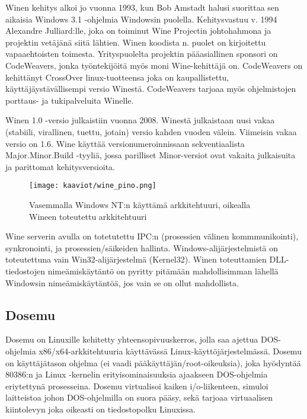 Winen kehitys alkoi jo vuonna 1993, kun Bob Amstadt halusi suorittaa sen aikaisia Windows 3.1 -ohjelmia Windowsin puolella. Kehitysvastuu v. 1994 Alexandre Julliard:lle, joka on toiminut Wine Projectin johtohahmona ja projektin vetäjänä siitä lähtien. Winen koodista n. puolet on kirjoitettu vapaaehtoisten toimesta. Yrityspuolelta projektin pääasiallinen sponsori on CodeWeavers, jonka työntekijöitä myös moni Wine-kehittäjä on. CodeWeavers on kehittänyt CrossOver linux-tuotteensa joka on kaupallistettu, käyttäjäystävällisempi versio Winestä. CodeWeavers tarjoaa myös ohjelmistojen porttaus- ja tukipalveluita Winelle.

Winen 1.0 -versio julkaistiin vuonna 2008. Winestä julkaistaan uusi vakaa (stabiili, virallinen, tuettu, jotain) versio kahden vuoden välein. Viimeisin vakaa versio on 1.6. Wine käyttää versionumeroinnissaan sekventiaalista Major.Minor.Build -tyyliä, jossa parilliset Minor-versiot ovat vakaita julkaisuita ja parittomat kehitysversioita.


\begin{figure}[H]
\centering
\texttt{[image: kaaviot/wine\_pino.png]}
\caption{Vasemmalla Windows NT:n käyttämä arkkitehtuuri, oikealla Wineen toteutettu arkkitehtuuri}
\end{figure}

Wine serverin avulla on totetutettu IPC:n (prosessien välinen kommmunikointi), synkronointi, ja prosessien/säikeiden hallinta. Windows-alijärjestelmistä on toteutettuna vain Win32-alijärjestelmä (Kernel32). Winen toteuttamien DLL-tiedostojen nimeämiskäytäntö on pyritty pitämään mahdollisimman lähellä Windowsin nimeämiskäytäntöä, jos vain se on ollut mahdollista. \cite{wine:architecture}

\subsection{Dosemu}

Dosemu on Linuxille kehitetty yhteensopivuuskerros, jolla saa ajettua DOS-ohjelmia x86/x64-arkkitehtuuria käyttävässä Linux-käyttöjärjestelmässä. Dosemu on käyttäjätason ohjelma (ei vaadi pääkäyttäjän/root-oikeuksia), joka hyödyntää 80386:n ja Linux -kernelin erityisominaisuuksia ajaakseen DOS-ohjelmia eriytettynä prosesseina. Dosemu virtualisoi kaiken i/o-liikenteen, simuloi laitteistoa johon DOS-ohjelmilla on suora pääsy, sekä tarjoaa virtuaalisen kiintolevyn joka oikeasti on tiedostopolku Linuxissa.

